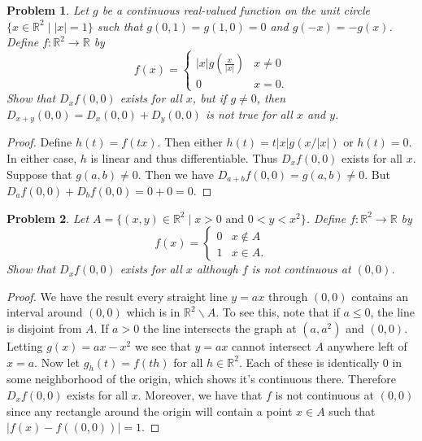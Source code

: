 \documentclass{article}
\newtheorem{problem}{Problem}
\begin{document}
\begin{flushleft}
\begin{problem}
Let $g$ be a continuous real-valued function on the unit circle $\{x \in \mathbb{R}^2 \mid |x| = 1\}$ such that $g(0,1) = g(1,0) = 0$ and $g(-x) = -g(x)$. Define $f : \mathbb{R}^2 \rightarrow \mathbb{R}$ by
\[
f(x) =
\begin{cases}
|x| g \left ( \frac{x}{|x|} \right ) & x \neq 0\\
0 & x = 0.
\end{cases}
\]
Show that $D_x f(0,0)$ exists for all $x$, but if $g \neq 0$, then $D_{x+y} (0,0) = D_x (0,0) + D_y (0,0)$ is not true for all $x$ and $y$.
\end{problem}
\begin{proof}
Define $h(t) = f(tx)$. Then either $h(t) = t |x| g(x/|x|)$ or $h(t) = 0$. In either case, $h$ is linear and thus differentiable. Thus $D_x f(0,0)$ exists for all $x$. Suppose that $g(a,b) \neq 0$. Then we have $D_{a+b} f(0,0) = g(a,b) \neq 0$. But $D_a f(0,0) + D_b f(0,0) = 0 + 0 = 0$.
\end{proof}

\begin{problem}
Let $A = \{(x,y) \in \mathbb{R}^2 \mid x > 0 \text{ and } 0 < y < x^2\}$. Define $f : \mathbb{R}^2 \rightarrow \mathbb{R}$ by
\[
f(x) =
\begin{cases}
0 & x \notin A\\
1 & x \in A.
\end{cases}
\]
Show that $D_x f(0,0)$ exists for all $x$ although $f$ is not continuous at $(0,0)$.
\end{problem}
\begin{proof}
We have the result every straight line $y=ax$ through $(0,0)$ contains an interval around $(0,0)$ which is in $\mathbb{R}^2 \backslash A$. To see this, note that if $a \leq 0$, the line is disjoint from $A$. If $a > 0$ the line intersects the graph at $(a, a^2)$ and $(0,0)$. Letting $g(x) = ax - x^2$ we see that $y=ax$ cannot intersect $A$ anywhere left of $x = a$. Now let $g_h(t) = f(th)$ for all $h \in \mathbb{R}^2$. Each of these is identically $0$ in some neighborhood of the origin, which shows it's continuous there. Therefore $D_x f(0,0)$ exists for all $x$. Moreover, we have that $f$ is not continuous at $(0,0)$ since any rectangle around the origin will contain a point $x \in A$ such that $|f(x) - f((0,0))| = 1$.
\end{proof}


\end{flushleft}
\end{document}
